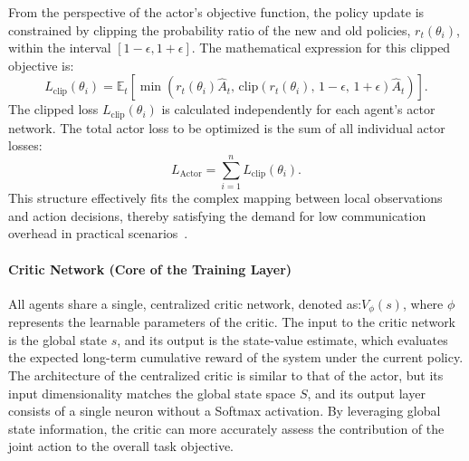 From the perspective of the actor's objective function, the policy update is constrained by clipping the probability ratio of the new and old policies, $r_t(\theta_i)$, within the interval $[1-\epsilon, 1+\epsilon]$. The mathematical expression for this clipped objective is:
\begin{equation}
    L_{\text{clip}}(\theta_i) = \mathbb{E}_t \left[ \min \left( r_t(\theta_i) \hat{A}_t,\, \text{clip}\left( r_t(\theta_i),\, 1-\epsilon,\, 1+\epsilon \right) \hat{A}_t \right) \right].
\end{equation}
The clipped loss $L_{\text{clip}}(\theta_i)$ is calculated independently for each agent's actor network. The total actor loss to be optimized is the sum of all individual actor losses:
\begin{equation}
    L_{\text{Actor}} = \sum_{i=1}^n L_{\text{clip}}(\theta_i).
\end{equation}
This structure effectively fits the complex mapping between local observations and action decisions, thereby satisfying the demand for low communication overhead in practical scenarios~\cite{yuSurprisingEffectivenessPPO2022}.

\paragraph{Critic Network (Core of the Training Layer)}
All agents share a single, centralized critic network, denoted as:$V_{\phi}(s)$,
where $\phi$ represents the learnable parameters of the critic. The input to the critic network is the global state $s$, and its output is the state-value estimate, which evaluates the expected long-term cumulative reward of the system under the current policy. The architecture of the centralized critic is similar to that of the actor, but its input dimensionality matches the global state space $S$, and its output layer consists of a single neuron without a Softmax activation. By leveraging global state information, the critic can more accurately assess the contribution of the joint action to the overall task objective.

